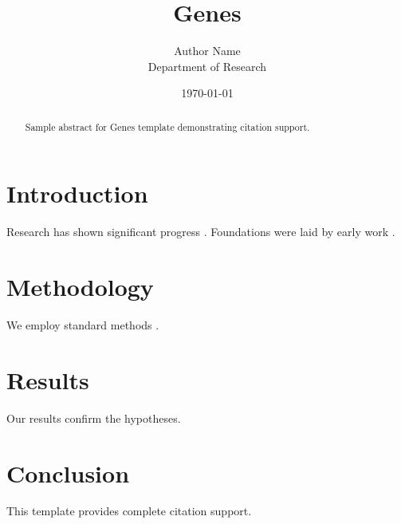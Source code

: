 \documentclass{mdpi}
\title{Genes}
\author{Author Name \\ \small Department of Research}
\date{\today}
\begin{document}
\maketitle

\begin{abstract}
Sample abstract for Genes template demonstrating citation support.
\end{abstract}

\section{Introduction}
Research has shown significant progress \citep{einstein1905}. Foundations were laid by early work \citep{turing1950}.

\section{Methodology}
We employ standard methods \citep{knuth1984}.

\section{Results}
Our results confirm the hypotheses.

\section{Conclusion}
This template provides complete citation support.



\end{document}
